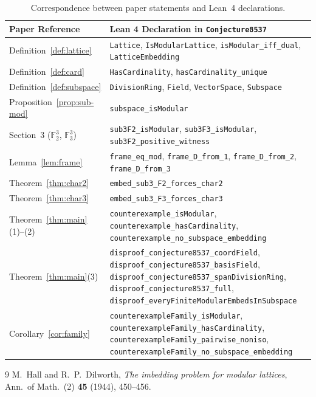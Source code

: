 \documentclass[11pt]{article}
\theoremstyle{definition}
\newcommand{\FF}{\mathbb{F}}
\begin{document}
\begin{table}[ht]
\centering
\small
\begin{tabular}{@{}l>{\raggedright\arraybackslash}p{}@{}}
\toprule
\textbf{Paper Reference} & \textbf{Lean 4 Declaration in \texttt{Conjecture8537}} \\
\midrule
Definition~\ref{def:lattice} & \texttt{Lattice}, \texttt{IsModularLattice}, \texttt{isModular\_iff\_dual}, \texttt{LatticeEmbedding} \\
Definition~\ref{def:card} & \texttt{HasCardinality}, \texttt{hasCardinality\_unique} \\
Definition~\ref{def:subspace} & \texttt{DivisionRing}, \texttt{Field}, \texttt{VectorSpace}, \texttt{Subspace} \\
Proposition~\ref{prop:sub-mod} & \texttt{subspace\_isModular} \\
Section~3 ($\FF_2^3$, $\FF_3^3$) & \texttt{sub3F2\_isModular}, \texttt{sub3F3\_isModular}, \texttt{sub3F2\_positive\_witness} \\
Lemma~\ref{lem:frame} & \texttt{frame\_eq\_mod}, \texttt{frame\_D\_from\_1}, \texttt{frame\_D\_from\_2}, \texttt{frame\_D\_from\_3} \\
Theorem~\ref{thm:char2} & \texttt{embed\_sub3\_F2\_forces\_char2} \\
Theorem~\ref{thm:char3} & \texttt{embed\_sub3\_F3\_forces\_char3} \\
Theorem~\ref{thm:main}(1)--(2) & \texttt{counterexample\_isModular}, \texttt{counterexample\_hasCardinality}, \texttt{counterexample\_no\_subspace\_embedding} \\
Theorem~\ref{thm:main}(3) & \texttt{disproof\_conjecture8537\_coordField}, \texttt{disproof\_conjecture8537\_basisField}, \texttt{disproof\_conjecture8537\_spanDivisionRing}, \texttt{disproof\_conjecture8537\_full}, \texttt{disproof\_everyFiniteModularEmbedsInSubspace} \\
Corollary~\ref{cor:family} & \texttt{counterexampleFamily\_isModular}, \texttt{counterexampleFamily\_hasCardinality}, \texttt{counterexampleFamily\_pairwise\_noniso}, \texttt{counterexampleFamily\_no\_subspace\_embedding} \\
\bottomrule
\end{tabular}
\caption{Correspondence between paper statements and Lean~4 declarations.}
\label{tab:correspondence}
\end{table}

\begin{thebibliography}{9}
M.~Hall and R.~P.~Dilworth,
\emph{The imbedding problem for modular lattices},
Ann.\ of Math.\ (2) \textbf{45} (1944), 450--456.
\end{thebibliography}
\end{document}
